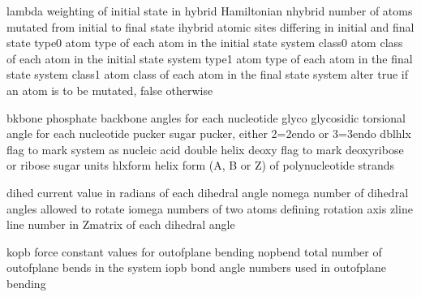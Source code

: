 \documentclass[letterpaper,11pt,english]{sphinxmanual}
\begin{document}

\begin{sphinxVerbatim}[commandchars=\\\{\}]
lambda          weighting of initial state in hybrid Hamiltonian
nhybrid         number of atoms mutated from initial to final state
ihybrid         atomic sites differing in initial and final state
type0           atom type of each atom in the initial state system
class0          atom class of each atom in the initial state system
type1           atom type of each atom in the final state system
class1          atom class of each atom in the final state system
alter           true if an atom is to be mutated, false otherwise
\end{sphinxVerbatim}


\begin{sphinxVerbatim}[commandchars=\\\{\}]
bkbone          phosphate backbone angles for each nucleotide
glyco           glycosidic torsional angle for each nucleotide
pucker          sugar pucker, either 2=2\PYGZsq{}\PYGZhy{}endo or 3=3\PYGZsq{}\PYGZhy{}endo
dblhlx          flag to mark system as nucleic acid double helix
deoxy           flag to mark deoxyribose or ribose sugar units
hlxform         helix form (A, B or Z) of polynucleotide strands
\end{sphinxVerbatim}


\begin{sphinxVerbatim}[commandchars=\\\{\}]
dihed           current value in radians of each dihedral angle
nomega          number of dihedral angles allowed to rotate
iomega          numbers of two atoms defining rotation axis
zline           line number in Z\PYGZhy{}matrix of each dihedral angle
\end{sphinxVerbatim}


\begin{sphinxVerbatim}[commandchars=\\\{\}]
kopb            force constant values for out\PYGZhy{}of\PYGZhy{}plane bending
nopbend         total number of out\PYGZhy{}of\PYGZhy{}plane bends in the system
iopb            bond angle numbers used in out\PYGZhy{}of\PYGZhy{}plane bending
\end{sphinxVerbatim}
\end{document}
